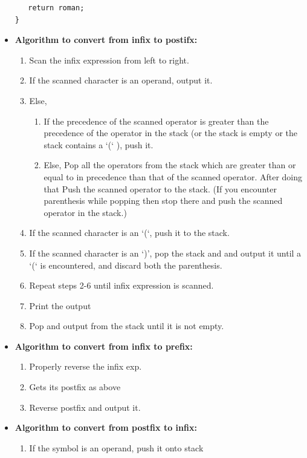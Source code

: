 \documentclass[8pt, a4paper, oneside, twocolumn]{extarticle}
\begin{document}
\begin{itemize}
\begin{verbatim}
   return roman;
}

    \end{verbatim}
    \item \textbf{Algorithm to convert from infix to postifx: }
        \begin{enumerate}
        \item Scan the infix expression from left to right.
        \item If the scanned character is an operand, output it.
        \item Else,
            \begin{enumerate}
            \item If the precedence of the scanned operator is greater than the precedence of the operator in the stack (or the stack is empty or the stack contains a ‘(‘ ), push it.
            \item  Else, Pop all the operators from the stack which are greater than or equal to in precedence than that of the scanned operator. After doing that Push the scanned operator to the stack. (If you encounter parenthesis while popping then stop there and push the scanned operator in the stack.)
            \end{enumerate}
        \item If the scanned character is an ‘(‘, push it to the stack.
        \item If the scanned character is an ‘)’, pop the stack and and output it until a ‘(‘ is encountered, and discard both the parenthesis.
        \item Repeat steps 2-6 until infix expression is scanned.
        \item Print the output
        \item Pop and output from the stack until it is not empty.
        \end{enumerate}
    \item \textbf{Algorithm to convert from infix to prefix: }
        \begin{enumerate}
        \item Properly reverse the infix exp.
        \item Gets its postfix as above
        \item Reverse postfix and output it.
        \end{enumerate}
    \item \textbf{Algorithm to convert from postfix to infix: }
        \begin{enumerate}
        \item If the symbol is an operand, push it onto stack

\end{enumerate}
\end{itemize}
\end{document}
